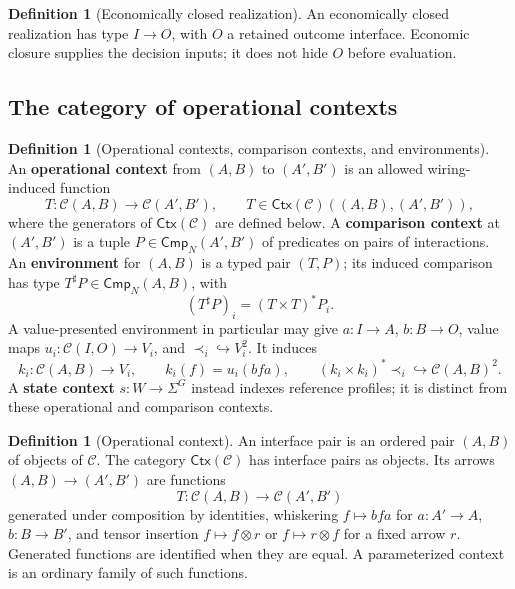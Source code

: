 \documentclass[11pt,a4paper]{article}
\numberwithin{equation}{section}
\theoremstyle{definition}
\newtheorem{definition}[theorem]{Definition}
\theoremstyle{remark}
\theoremstyle{plain}
\begin{document}
\begin{definition}[Economically closed realization]
\label{def:egt-economically-closed-realization}
An economically closed realization has type $I\to O$, with $O$ a retained
outcome interface. Economic closure supplies the decision inputs; it does
not hide $O$ before evaluation.
\end{definition}

\subsection{The category of operational contexts}

\begin{definition}[Operational contexts, comparison contexts, and environments]
\label{def:egt-economic-contexts}
An \textbf{operational context} from $(A,B)$ to $(A',B')$ is an
allowed wiring-induced function
\[
 T:\mathcal C(A,B)\longrightarrow\mathcal C(A',B'),
 \qquad T\in\mathsf{Ctx}(\mathcal C)((A,B),(A',B')),
\]
where the generators of $\mathsf{Ctx}(\mathcal C)$ are defined below.
A \textbf{comparison context} at $(A',B')$ is a tuple
$P\in\mathsf{Cmp}_N(A',B')$ of predicates on pairs of interactions.
An \textbf{environment} for $(A,B)$ is a typed pair $(T,P)$; its
induced comparison has type
$T^\sharp P\in\mathsf{Cmp}_N(A,B)$, with
\[
 (T^\sharp P)_i=(T\times T)^*P_i.
\]
A value-presented environment in particular may give
$a:I\to A$, $b:B\to O$, value maps
$u_i:\mathcal C(I,O)\to V_i$, and
$\prec_i\hookrightarrow V_i^2$. It induces
\[
 k_i:\mathcal C(A,B)\to V_i,\qquad
 k_i(f)=u_i(bfa),\qquad
 (k_i\times k_i)^*\prec_i\hookrightarrow\mathcal C(A,B)^2.
\]
A \textbf{state context} $s:W\to\Sigma^G$ instead indexes reference
profiles; it is distinct from these operational and comparison contexts.
\end{definition}
\begin{definition}[Operational context]
\label{def:egt-context}
An interface pair is an ordered pair $(A,B)$ of objects of $\mathcal C$.
The category $\mathsf{Ctx}(\mathcal C)$ has interface pairs as objects.
Its arrows $(A,B)\to(A',B')$ are functions
\[
 T:\mathcal C(A,B)\longrightarrow\mathcal C(A',B')
\]
generated under composition by identities, whiskering
$f\mapsto bfa$ for $a:A'\to A$, $b:B\to B'$, and tensor insertion
$f\mapsto f\otimes r$ or $f\mapsto r\otimes f$ for a fixed arrow $r$.
Generated functions are identified when they are equal. A parameterized
context is an ordinary family of such functions.
\end{definition}
\end{document}
